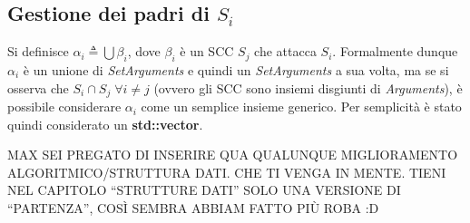 \subsection{Gestione dei padri di $S_i$}
Si definisce $\alpha_i \triangleq \bigcup \beta_i$, dove $\beta_i$ è un SCC
$S_j$ che attacca $S_i$. Formalmente dunque $\alpha_i$ è un unione di
\emph{SetArguments} e quindi un \emph{SetArguments} a sua volta, ma se si
osserva che $S_i \cap S_j \; \forall i\neq j$ (ovvero gli SCC sono insiemi
disgiunti di \emph{Arguments}), è possibile considerare $\alpha_i$ come un
semplice insieme generico. Per semplicità è stato quindi considerato un
\textbf{std::vector}.


MAX SEI PREGATO DI INSERIRE QUA QUALUNQUE MIGLIORAMENTO ALGORITMICO/STRUTTURA DATI. CHE TI VENGA IN MENTE.
TIENI NEL CAPITOLO ``STRUTTURE DATI'' SOLO UNA VERSIONE DI ``PARTENZA'', COSÌ SEMBRA ABBIAM FATTO PIÙ ROBA :D
